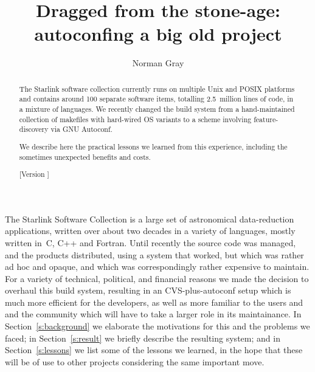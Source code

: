 \documentclass{speauth}
\begin{document}


\title{Dragged from the stone-age: autoconfing a big old project}

\author{Norman Gray\footnotemark}

\noreceived{}
\norevised{}
\noaccepted{}



\begin{abstract}
The Starlink software collection currently runs on multiple
Unix and POSIX platforms and contains around 100 separate software items,
totalling 2.5~million lines of code, in a mixture of languages.  We
recently changed the build system from a hand-maintained collection of
makefiles with hard-wired OS variants to a scheme involving
feature-discovery via GNU Autoconf.

We describe here the practical lessons we learned from this
experience, including the sometimes unexpected benefits and costs.

[Version \RCSRevision]
\end{abstract}



The Starlink Software Collection \cite{draper05} is a large set of
astronomical data-reduction 
applications, written over about two decades in a variety of
languages, mostly written in~C, C++ and Fortran.  Until recently the source
code was managed, and the
products distributed, using a system that worked, but which was
rather ad hoc and opaque, and which was correspondingly rather
expensive to maintain.  For a variety of technical, political, and financial
reasons we made the decision to overhaul this build system, resulting
in an CVS-plus-autoconf setup which is much more efficient for the
developers, as well as more familiar to the users and and the
community which will have to take a larger role in its maintainance.
In Section~\ref{s:background} we elaborate the 
motivations for this and the problems we faced; in
Section~\ref{s:result} we briefly describe the resulting system; and
in Section~\ref{s:lessons} we list some of the lessons we learned, in
the hope that these will be of use to other projects considering the
same important move.
\end{document}

